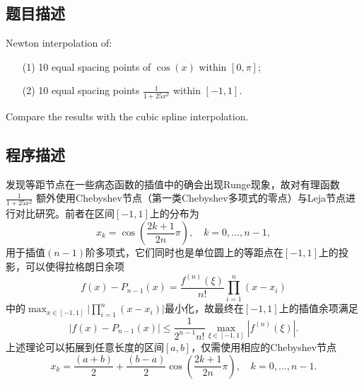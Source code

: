 \subsection{题目描述}
\noindent Newton interpolation of:
\begin{itemize}
    \item[(1)] 10 equal spacing points of \( \cos(x) \) within \( [0, \pi] \);
    \item[(2)] 10 equal spacing points \( \frac{1}{1 + 25x^2} \) within \([-1, 1]\).
\end{itemize}
Compare the results with the cubic spline interpolation.

\subsection{程序描述}
发现等距节点在一些病态函数的插值中的确会出现Runge现象，故对有理函数\( \frac{1}{1 + 25x^2} \) 额外使用Chebyshev节点（第一类Chebyshev多项式的零点）与Leja节点进行对比研究。前者在区间\([-1, 1]\)上的分布为
\[x_k=\cos{\left(\frac{2k+1}{2n}\pi\right)},\quad k=0,\ldots,n-1,\]
用于插值\((n-1)\)阶多项式，它们同时也是单位圆上的等距点在\([-1, 1]\)上的投影，可以使得拉格朗日余项
\[f(x)-P_{n-1}(x)=\frac{f^{(n)}(\xi)}{n!}\prod_{i=1}^n(x-x_i)\]
中的\(\max_{x\in[-1,1]}\Big|\prod_{i=1}^n(x-x_i)\Big|\)最小化，故最终在\([-1, 1]\)上的插值余项满足
\[|f(x)-P_{n-1}(x)|\leq\frac1{2^{n-1}n!}\max_{\xi\in[-1,1]}\left|f^{(n)}(\xi)\right|.\]上述理论可以拓展到任意长度的区间\([a,b]\)，仅需使用相应的Chebyshev节点
\[x_k=\frac{(a+b)}2+\frac{(b-a)}2\cos\left(\frac{2k+1}{2n}\pi\right),\quad k=0,\ldots,n-1.\]

